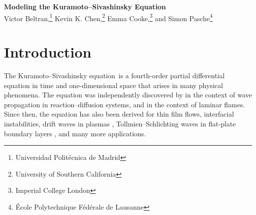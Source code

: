 \documentclass[11pt]{article}
\newcommand{\KSE}{Kuramoto--Sivashinsky equation}
\begin{document}
\begin{center}
    {\bf \Large Modeling the Kuramoto--Sivashinsky Equation}\\
    \vspace{0.3cm}
    {%
        \large{%
            Victor Beltran,\footnote{Universidad Polit\'ecnica de Madrid}
            Kevin K. Chen,\footnote{University of Southern California}
            Emma Cooke,\footnote{Imperial College London} and
            Simon Pasche\footnote{\'Ecole Polytechnique F\'ed\'erale de Lausanne}%
        }%
    }
\end{center}
\vspace{0.3cm}

\begin{abstract}
    We investigate the nonlinear dynamics and modeling of the \KSE.
    Both the parallel equation with periodic boundary conditions, as well as a non-parallel equation on an infinite domain, are considered.
    In both equations, we report three cases where the stable solution is the trivial solution, a simple periodic orbit of a single frequency, and a more complex periodic orbit exhibiting multiple harmonics.
    In particular, the parallel periodic equation has analytical eigenvalues and eigenmodes, which allow an simple characterization of the Hopf bifurcation.
    The various types of solutions are demonstrated with phase portraits.
    Next, we compute POD-DEIM modes and reduced-order models for the parallel equation.
    Not only does POD-DEIM capture the limit cycle with a comparatively small number of modes, but also, transient modes correctly capture the limit cycle, and limit cycle modes correctly capture the transients.
\end{abstract}

\section{Introduction}

The \KSE\ is a fourth-order partial differential equation in time and one-dimensional space that arises in many physical phenomena.
The equation was independently discovered by \cite{KuramotoPTP76} in the context of wave propagation in reaction--diffusion systems, and \cite{SivashinskyAA77} in the context of laminar flames.
Since then, the equation has also been derived for thin film flows, interfacial instabilities, drift waves in plasmas \citep[see][]{KevrekidisSIAMJAM90}, Tollmien--Schlichting waves in flat-plate boundary layers \citep{FabbianeAMR14}, and many more applications.
\end{document}
